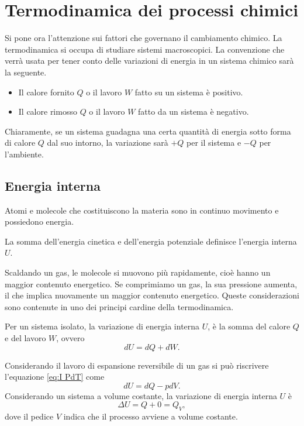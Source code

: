 \chapter{Termodinamica dei processi chimici}
Si pone ora l'attenzione sui fattori che governano il cambiamento chimico. La termodinamica si occupa di studiare sistemi macroscopici. La convenzione che verrà usata per tener conto delle variazioni di energia in un sistema chimico sarà la seguente.
\begin{notz}\hfill
    \begin{itemize}
        \item Il calore fornito $Q$ o il lavoro $W$ fatto su un sistema è positivo.
        \item Il calore rimosso $Q$ o il lavoro $W$ fatto da un sistema è negativo.
    \end{itemize}
    Chiaramente, se un sistema guadagna una certa quantità di energia sotto forma di calore $Q$ dal suo intorno, la variazione sarà $+Q$ per il sistema e $-Q$ per l'ambiente. 
\end{notz}

\section{Energia interna}
Atomi e molecole che costituiscono la materia sono in continuo movimento e possiedono energia.
\begin{defn}
    La somma dell'energia cinetica e dell'energia potenziale definisce l'energia interna $U$.
\end{defn}
Scaldando un gas, le molecole si muovono più rapidamente, cioè hanno un maggior contenuto energetico. Se comprimiamo un gas, la sua pressione aumenta, il che implica nuovamente un maggior contenuto energetico. Queste considerazioni sono contenute in uno dei principi cardine della termodinamica.
\begin{axiom}
    Per un sistema isolato, la variazione di energia interna $U$, è la somma del calore $Q$ e del lavoro $W$, ovvero
    \begin{equation}\label{eq:I PdT}
        dU=dQ+dW.
    \end{equation}
\end{axiom}
Considerando il lavoro di espansione reversibile di un gas si può riscrivere l'equazione \eqref{eq:I PdT} come
\begin{equation}
    dU=dQ-pdV.
\end{equation}
Considerando un sistema a volume costante, la variazione di energia interna $U$ è
\begin{equation}
    \Delta U=Q+0=Q_V,
\end{equation}
dove il pedice $V$ indica che il processo avviene a volume costante. 

